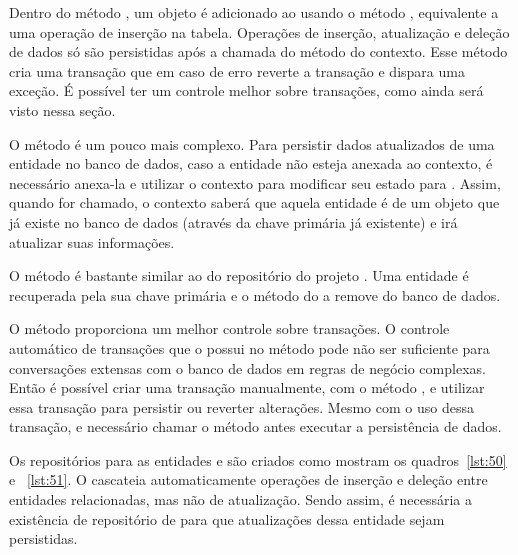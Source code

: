 Dentro do método , um objeto é adicionado ao  usando o método , equivalente a uma operação de inserção na tabela. Operações de inserção, atualização e deleção de dados só são persistidas após a chamada do método  do contexto. Esse método cria uma transação que em caso de erro reverte a transação e dispara uma exceção. É possível ter um controle melhor sobre transações, como ainda será visto nessa seção.

O método  é um pouco mais complexo. Para persistir dados atualizados de uma entidade no banco de dados, caso a entidade não esteja anexada ao contexto, é necessário anexa-la e utilizar o contexto para modificar seu estado para . Assim, quando  for chamado, o contexto saberá que aquela entidade é de um objeto que já existe no banco de dados (através da chave primária já existente) e irá atualizar suas informações.

O método  é bastante similar ao do repositório do projeto . Uma entidade é recuperada pela sua chave primária e o método  do  a remove do banco de dados.

O método  proporciona um melhor controle sobre transações. O controle automático de transações que o  possui no método  pode não ser suficiente para conversações extensas com o banco de dados em regras de negócio complexas. Então é possível criar uma transação manualmente, com o método , e utilizar essa transação para persistir ou reverter alterações. Mesmo com o uso dessa transação, e necessário chamar o método  antes executar a persistência de dados.

Os repositórios para as entidades  e  são criados como mostram os quadros~\ref{lst:50} e ~\ref{lst:51}. O  cascateia automaticamente operações de inserção e deleção entre entidades relacionadas, mas não de atualização. Sendo assim, é necessária a existência de repositório de  para que atualizações dessa entidade sejam persistidas.



